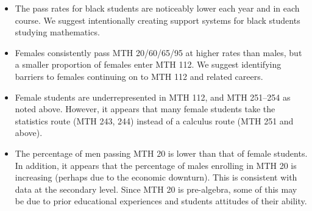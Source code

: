 \begin{itemize}
      a decrease in the total number of black students in MTH 60 compared to
      MTH 20. This indicates that MTH 20 is likely a significant barrier to
      some minority students or that minority students place into MTH 20 at a
      disproportionately high rate. Although this is relatively consistent with
      national data, we would like the administration to continue to support
      programs like Passages, Project Independence, ROOTS, and other interventions 
      to increase success rates of
      minority students. In addition, a more diverse faculty might help with
      retention and passing rates; \emph{ the extent to which [the instructor's attributes]
      differ from the physical, cultural, and intellectual backgrounds of [his/her] students
      will have a profound effect on the interactions in [the] classroom.}
      \footnote{\url{http://www.crlt.umich.edu/gsis/p3_2}}.
    \item The pass rates for black students are noticeably lower each year and
      in each course. We suggest intentionally creating support systems for
      black students studying mathematics.
    \item Females consistently pass MTH 20/60/65/95 at higher rates than males,
      but a smaller proportion of females enter MTH 112. We suggest identifying
      barriers to females continuing on to MTH 112 and related careers.
    \item Female students are underrepresented in MTH 112, and MTH 251--254 as
      noted above. However, it appears that many female students take the
      statistics route (MTH 243, 244) instead of a calculus route (MTH 251 and above).
    \item The percentage of men passing MTH 20 is lower than that of female
      students. In addition, it appears that the percentage of males enrolling
      in MTH 20 is increasing (perhaps due to the economic downturn). This is
      consistent with data at the secondary level. Since MTH 20 is pre-algebra,
      some of this may be due to prior educational experiences and students
      attitudes of their ability.
\end{itemize}

